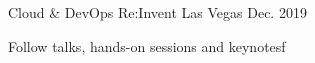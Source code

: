 \begin{cventries}
  \cventry
    {Cloud \& DevOps} %
    {Re:Invent} %
    {Las Vegas} %
    {Dec. 2019} %
    {
      \begin{cvitems} %
        \item {Follow talks, hands-on sessions and keynotes}f
      \end{cvitems}
    }

\end{cventries}
